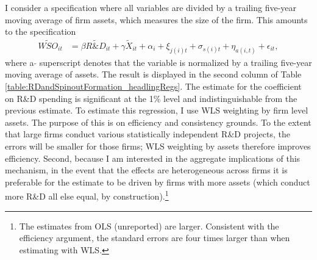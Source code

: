 I consider a specification where all variables are divided by a trailing five-year moving average of firm assets, which measures the size of the firm. This amounts to the specification
\begin{align}
	\tilde{WSO}_{it} &= \beta \tilde{R\&D}_{it} + \gamma \tilde{X}_{it} + \alpha_{i} + \xi_{j(i)t} + \sigma_{s(i)t} + \eta_{a(i,t)} + \epsilon_{it},
\end{align}
where a $\tilde{}$ superscript denotes that the variable is normalized by a trailing five-year moving average of assets. The result is displayed in the second column of Table \ref{table:RDandSpinoutFormation_headlingRegs}. The estimate for the coefficient on R\&D spending is significant at the 1\% level and indistinguishable from the previous estimate. To estimate this regression, I use WLS weighting by firm level assets. The purpose of this is on efficiency and consistency grounds. To the extent that large firms conduct various statistically independent R\&D projects, the errors will be smaller for those firms; WLS weighting by assets therefore improves efficiency. Second, because I am interested in the aggregate implications of this mechanism, in the event that the effects are heterogeneous across firms it is preferable for the estimate to be driven by firms with more assets (which conduct more R\&D all else equal, by construction).\footnote{The estimates from OLS (unreported) are larger. Consistent with the efficiency argument, the standard errors are four times larger than when estimating with WLS.}